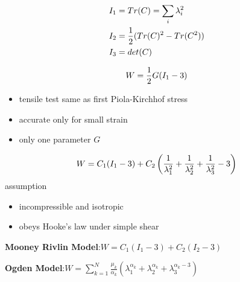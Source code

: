\documentclass[landscape,a0paper,fontscale=0.285]{baposter} %
\newcommand{\compresslist}{ %
\setlength{\itemsep}{1pt}
\setlength{\parskip}{0pt}
\setlength{\parsep}{0pt}
}
\begin{document}
\begin{poster}
{$$\vspace{-0.2cm}
\begin{aligned}
I_1 &= Tr(C) = \sum_i \lambda_i^2 \\
I_2 &= \frac{1}{2}(Tr(C)^2 - Tr(C^2)) \\
I_3 &= det(C)
\end{aligned}
$$


\colorbox[HTML]{CCFFFF}{}\vspace{-0.3cm}
$$\vspace{-0.3cm}
W = \frac{1}{2}G(I_1 - 3)
$$
\begin{itemize}\compresslist
    \item tensile test same as first Piola-Kirchhof stress
    \item accurate only for small strain
    \item only one parameter $G$
\end{itemize}

\colorbox[HTML]{CCFFFF}{}\vspace{-0.3cm}
$$\vspace{-0.3cm}
W=C_1(I_1 - 3) + C_2\left(\frac{1}{\lambda_1^2} +\frac{1}{\lambda_2^2} + \frac{1}{\lambda_3^2}-3\right)
$$
assumption
\begin{itemize}\compresslist
    \item incompressible and isotropic
    \item obeys Hooke’s law under simple shear
\end{itemize}

\colorbox[HTML]{CCFFFF}{}
\textbf{Mooney Rivlin Model}:$W = C_1(I_1-3) + C_2(I_2-3)$

\textbf{Ogden Model}:$W = \sum_{k=1}^N\frac{\mu_k}{\alpha_k}(\lambda_1^{\alpha_k} + \lambda_2^{\alpha_k} + \lambda_3^{\alpha_k - 3})$
}


\end{poster}
\end{document}

